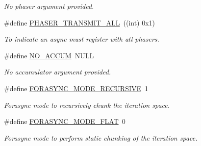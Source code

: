 \begin{DoxyCompactItemize}
\begin{DoxyCompactList}\small\item\em No phaser argument provided. \end{DoxyCompactList}\item 
\hypertarget{group__HClib_ga9dd15754e926a2c1e65973b507aeebf5}{\#define \hyperlink{group__HClib_ga9dd15754e926a2c1e65973b507aeebf5}{P\-H\-A\-S\-E\-R\-\_\-\-T\-R\-A\-N\-S\-M\-I\-T\-\_\-\-A\-L\-L}~((int) 0x1)}\label{group__HClib_ga9dd15754e926a2c1e65973b507aeebf5}

\begin{DoxyCompactList}\small\item\em To indicate an async must register with all phasers. \end{DoxyCompactList}\item 
\hypertarget{group__HClib_ga5cda37917665d138da9fd1af8d8e906d}{\#define \hyperlink{group__HClib_ga5cda37917665d138da9fd1af8d8e906d}{N\-O\-\_\-\-A\-C\-C\-U\-M}~N\-U\-L\-L}\label{group__HClib_ga5cda37917665d138da9fd1af8d8e906d}

\begin{DoxyCompactList}\small\item\em No accumulator argument provided. \end{DoxyCompactList}\item 
\hypertarget{group__HClib_ga4fc84f9b5d90304e6b0ccd2f89a93a15}{\#define \hyperlink{group__HClib_ga4fc84f9b5d90304e6b0ccd2f89a93a15}{F\-O\-R\-A\-S\-Y\-N\-C\-\_\-\-M\-O\-D\-E\-\_\-\-R\-E\-C\-U\-R\-S\-I\-V\-E}~1}\label{group__HClib_ga4fc84f9b5d90304e6b0ccd2f89a93a15}

\begin{DoxyCompactList}\small\item\em Forasync mode to recursively chunk the iteration space. \end{DoxyCompactList}\item 
\hypertarget{group__HClib_gaeda817ba1de14a7658f7a8f60c908bfd}{\#define \hyperlink{group__HClib_gaeda817ba1de14a7658f7a8f60c908bfd}{F\-O\-R\-A\-S\-Y\-N\-C\-\_\-\-M\-O\-D\-E\-\_\-\-F\-L\-A\-T}~0}\label{group__HClib_gaeda817ba1de14a7658f7a8f60c908bfd}

\begin{DoxyCompactList}\small\item\em Forasync mode to perform static chunking of the iteration space. \end{DoxyCompactList}\end{DoxyCompactItemize}
